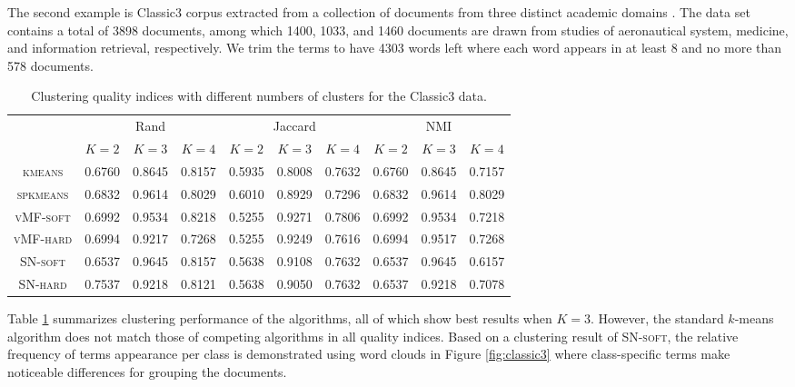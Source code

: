\documentclass[11pt]{article}
\begin{document}
The second example is \textsf{Classic3} corpus extracted from a collection of documents from three distinct academic domains \citep{dhillon_information-theoretic_2003}. The data set contains a total of 3898 documents, among which 1400, 1033, and 1460 documents are drawn from studies of aeronautical system, medicine, and information retrieval, respectively. We trim the terms to have 4303 words left where each word appears in at least 8 and no more than 578 documents.
\begin{table}[ht]
	\begin{center}
		\begin{tabular}{|c|c|c|c|c|c|c|c|c|c|}
			\hline
			\multirow{2}{*}{} & \multicolumn{3}{c|}{Rand} & \multicolumn{3}{c|}{Jaccard} & \multicolumn{3}{c|}{NMI} \\ \cline{2-10} 
			& $K=2$     & $K=3$    & $K=4$    & $K=2$      & $K=3$     & $K=4$     & $K=2$   & $K=3$   & $K=4$    \\ \hline
\textsc{kmeans} & 0.6760 & 0.8645 & 0.8157 & 0.5935 & 0.8008 & 0.7632 & 0.6760 & 0.8645 & 0.7157 \\ 
\textsc{spkmeans} & 0.6832 & 0.9614 & 0.8029 & 0.6010 & 0.8929 & 0.7296 & 0.6832 & 0.9614 & 0.8029 \\ 
\textsc{vMF-soft} & 0.6992 & 0.9534 & 0.8218 & 0.5255 & 0.9271 & 0.7806 & 0.6992 & 0.9534 & 0.7218 \\ 
\textsc{vMF-hard} & 0.6994 & 0.9217 & 0.7268 & 0.5255 & 0.9249 & 0.7616 & 0.6994 & 0.9517 & 0.7268 \\ 
\textsc{SN-soft} & 0.6537 & 0.9645 & 0.8157 & 0.5638 & 0.9108 & 0.7632 & 0.6537 & 0.9645 & 0.6157 \\ 
\textsc{SN-hard} & 0.7537 & 0.9218 & 0.8121 & 0.5638 & 0.9050 & 0.7632 & 0.6537 & 0.9218 & 0.7078 \\ \hline
		\end{tabular}
	\end{center}
	\caption{Clustering quality indices with different numbers of clusters for the \textsf{Classic3} data.}
	\label{table:classic3}
\end{table}
Table \ref{table:classic3} summarizes clustering performance of the algorithms, all of which show best results when $K=3$. However, the standard $k$-means algorithm does not match those of competing algorithms in all quality indices. Based on a clustering result of \textsc{SN-soft}, the relative frequency of terms appearance per class is demonstrated using word clouds in Figure \ref{fig:classic3} where class-specific terms make noticeable differences for grouping the documents. 
\end{document}
